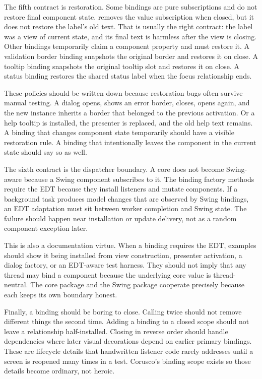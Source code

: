 The fifth contract is restoration. Some bindings are pure subscriptions and do
not restore final component state.  removes the
value subscription when closed, but it does not restore the label's old text.
That is usually the right contract: the label was a view of current state, and
its final text is harmless after the view is closing. Other bindings
temporarily claim a component property and must restore it. A validation border
binding snapshots the original border and restores it on close. A tooltip
binding snapshots the original tooltip slot and restores it on close. A status
binding restores the shared status label when the focus relationship ends.

These policies should be written down because restoration bugs often survive
manual testing. A dialog opens, shows an error border, closes, opens again, and
the new instance inherits a border that belonged to the previous activation. Or
a help tooltip is installed, the presenter is replaced, and the old help text
remains. A binding that changes component state temporarily should have a
visible restoration rule. A binding that intentionally leaves the component in
the current state should say so as well.

The sixth contract is the dispatcher boundary. A core  does
not become Swing-aware because a Swing component subscribes to it. The binding
factory methods require the EDT because they install listeners and mutate
components. If a background task produces model changes that are observed by
Swing bindings, an EDT adaptation must sit between worker completion and Swing
state. The failure should happen near installation or update delivery, not as a
random component exception later.

This is also a documentation virtue. When a binding requires the EDT, examples
should show it being installed from view construction, presenter activation, a
dialog factory, or an EDT-aware test harness. They should not imply that any
thread may bind a component because the underlying core value is thread-neutral.
The core package and the Swing package cooperate precisely because each keeps
its own boundary honest.

Finally, a binding should be boring to close. Calling  twice should
not remove different things the second time. Adding a binding to a closed scope
should not leave a relationship half-installed. Closing in reverse order should
handle dependencies where later visual decorations depend on earlier primary
bindings. These are lifecycle details that handwritten listener code rarely
addresses until a screen is reopened many times in a test. Corusco's binding
scope exists so those details become ordinary, not heroic.

